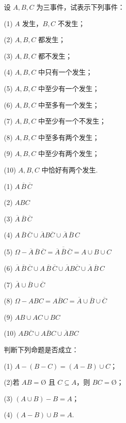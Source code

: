 \question 设 $A,B,C$ 为三事件，试表示下列事件：

(1) $A$ 发生，$B,C$ 不发生；

(2) $A,B,C$ 都发生；

(3) $A,B,C$ 都不发生；

(4) $A,B,C$ 中只有一个发生；

(5) $A,B,C$ 中至少有一个发生；

(6) $A,B,C$ 中至多有一个发生；

(7) $A,B,C$ 中至少有一个不发生；

(8) $A,B,C$ 中至多有两个发生；

(9) $A,B,C$ 中至少有两个发生；

(10) $A,B,C$ 中恰好有两个发生.

\begin{solution}
    (1) $A \, \overline{B} \, \overline{C}$

    (2) $ABC$

    (3) $\overline{A} \, \overline{B} \, \overline{C}$

    (4) $A \, \overline{B} \, \overline{C} \cup \overline{A} B \overline{C} \cup \overline{A} \, \overline{B} \, C$

    (5) $\varOmega - \overline{A} \, \overline{B} \, \overline{C} = \overline{\overline{A} \, \overline{B} \, \overline{C}} = A \cup B \cup C$

    (6) $\overline{A} \, \overline{B} \, \overline{C} \cup A \, \overline{B} \, \overline{C} \cup \overline{A} B \overline{C} \cup \overline{A} \, \overline{B} \, C$

    (7) $\overline{A} \cup \overline{B} \cup \overline{C}$

    (8) $\varOmega - ABC = \overline{ABC} = \overline{A} \cup \overline{B} \cup \overline{C}$

    (9) $AB \cup AC \cup BC$

    (10) $AB \overline{C} \cup A \overline{B} C \cup \overline{A} BC$
\end{solution}

\question 判断下列命题是否成立：

(1) $A-(B-C) = (A-B) \cup C$；

(2)若 $AB = \text{\O}$ 且 $C \subseteq A$，则 $BC = \text{\O}$；

(3) $(A \cup B) - B = A$；

(4) $(A - B) \cup B = A$.

